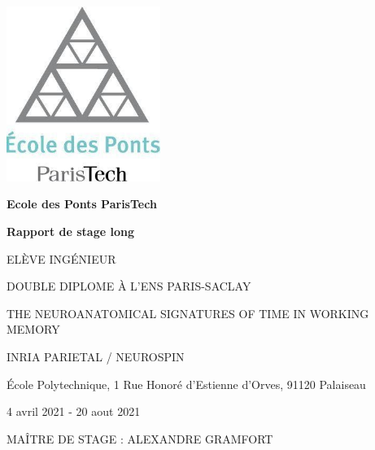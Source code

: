 \begin{titlepage}
    \begin{center}
        
        
        \includegraphics[width=5cm]{preliminaries/images/logo_ponts.jpg}
        
        \vspace{0.5cm}
        
        \textbf{Ecole des Ponts ParisTech}

        \vspace{1.5cm}
        
        \textbf{\Large Rapport de stage long}
        
        \vspace{0.5cm}
        
        \MakeUppercase{\theauthor{}}
        
        \MakeUppercase{Elève ingénieur}
        
        \MakeUppercase{Double diplome à l'ENS Paris-Saclay}
        
        \vspace{1.5cm}
        
        \MakeUppercase{\Large The neuroanatomical signatures of time in working memory}
        
    
        
        
        
        \vfill
        
        \MakeUppercase{INRIA Parietal / Neurospin}
        
        École Polytechnique, 1 Rue Honoré d'Estienne d'Orves, 91120 Palaiseau
        
        4 avril 2021 - 20 aout 2021
        
        \MakeUppercase{Maître de stage : Alexandre Gramfort}
        


        
    
        
    \end{center}
\end{titlepage}
